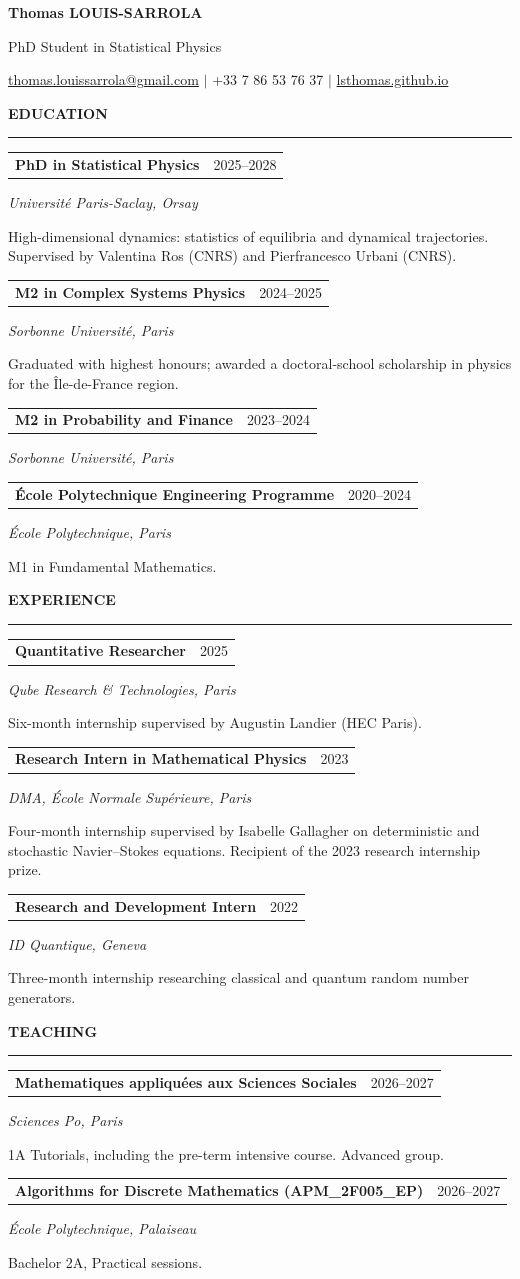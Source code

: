 \documentclass[9pt,a4paper]{extarticle}
\makeatletter
\newcommand{\cvsection}[1]{%
  \vspace{0.48em}%
  {\large\bfseries\color{accent}\MakeUppercase{#1}}\\[-0.45em]
  {\color{accent}\rule{\linewidth}{0.55pt}}\par\vspace{0.22em}
}
\newcommand{\entry}[4]{%
  \begin{tabularx}{\linewidth}{@{}Xr@{}}
    \textbf{#1} & #2 \\
  \end{tabularx}\par
  {\itshape #3}\par
  #4\par\vspace{0.32em}
}
\makeatother
\begin{document}
\begin{center}
  {\fontsize{23}{27}\selectfont\bfseries Thomas LOUIS-SARROLA}\par
  \vspace{0.15em}
  {\large PhD Student in Statistical Physics}\par
  \vspace{0.35em}
  \href{mailto:thomas.louissarrola@gmail.com}{thomas.louissarrola@gmail.com}
  \quad $\vert$ \quad
  +33 7 86 53 76 37
  \quad $\vert$ \quad
  \href{https://lsthomas.github.io}{lsthomas.github.io}
\end{center}

\cvsection{Education}
\entry{PhD in Statistical Physics}{2025--2028}
  {Université Paris-Saclay, Orsay}
  {High-dimensional dynamics: statistics of equilibria and dynamical trajectories. Supervised by Valentina Ros (CNRS) and Pierfrancesco Urbani (CNRS).}

\entry{M2 in Complex Systems Physics}{2024--2025}
  {Sorbonne Université, Paris}
  {Graduated with highest honours; awarded a doctoral-school scholarship in physics for the Île-de-France region.}

\entry{M2 in Probability and Finance}{2023--2024}
  {Sorbonne Université, Paris}
  {}

\entry{École Polytechnique Engineering Programme}{2020--2024}
  {École Polytechnique, Paris}
  {M1 in Fundamental Mathematics.}

\cvsection{Experience}
\entry{Quantitative Researcher}{2025}
  {Qube Research \& Technologies, Paris}
  {Six-month internship supervised by Augustin Landier (HEC Paris).}

\entry{Research Intern in Mathematical Physics}{2023}
  {DMA, École Normale Supérieure, Paris}
  {Four-month internship supervised by Isabelle Gallagher on deterministic and stochastic Navier--Stokes equations. Recipient of the 2023 research internship prize.}

\entry{Research and Development Intern}{2022}
  {ID Quantique, Geneva}
  {Three-month internship researching classical and quantum random number generators.}

\cvsection{Teaching}
\entry{Mathematiques appliquées aux Sciences Sociales}{2026--2027}
  {Sciences Po, Paris}
  {1A Tutorials, including the pre-term intensive course. Advanced group.}

\entry{Algorithms for Discrete Mathematics (APM\_2F005\_EP)}{2026--2027}
  {École Polytechnique, Palaiseau}
  {Bachelor 2A, Practical sessions.}
\end{document}
